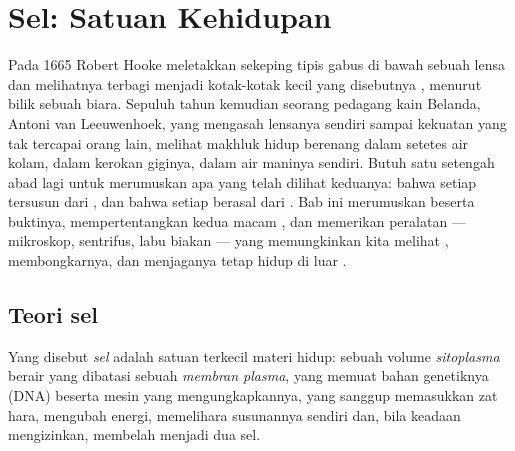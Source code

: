 \chapter{Sel: Satuan Kehidupan}\label{ch:b1:cell-unit-of-life}

Pada 1665 Robert Hooke meletakkan sekeping tipis gabus di bawah sebuah
lensa dan melihatnya terbagi menjadi kotak-kotak kecil yang disebutnya
, menurut bilik sebuah biara. Sepuluh tahun kemudian seorang pedagang
kain Belanda, Antoni van Leeuwenhoek, yang mengasah lensanya sendiri
sampai kekuatan yang tak tercapai orang lain, melihat makhluk hidup
berenang dalam setetes air kolam, dalam kerokan giginya, dalam air
maninya sendiri. Butuh satu setengah abad lagi untuk merumuskan apa yang
telah dilihat keduanya: bahwa setiap  tersusun dari , dan
bahwa setiap  berasal dari . Bab ini merumuskan  beserta
buktinya, mempertentangkan kedua macam , dan memerikan peralatan ---
mikroskop, sentrifus, labu biakan --- yang memungkinkan kita melihat
, membongkarnya, dan menjaganya tetap hidup di luar .

\section{Teori sel}

\begin{definition}[Sel]\label{def:b1:cell-unit-of-life:cell}
Yang disebut \emph{sel} adalah satuan terkecil materi hidup:
sebuah volume \emph{sitoplasma} berair yang dibatasi
sebuah \emph{membran plasma}, yang memuat bahan
genetiknya (DNA) beserta mesin yang mengungkapkannya, yang sanggup
memasukkan zat hara, mengubah energi, memelihara susunannya sendiri
dan, bila keadaan mengizinkan, membelah menjadi dua sel.
\end{definition}

